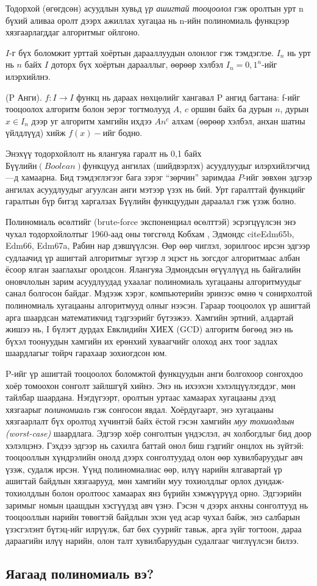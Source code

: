 Тодорхой (өгөгдсөн) асуудлын хувьд \textit{үр ашигтай тооцоолол} гэж оролтын урт n бүхий аливаа оролт дээрх ажиллах хугацаа нь n-ийн полиномиаль функцээр хязгаарлагддаг алгоритмыг ойлгоно.


$I$-г бүх боломжит урттай хоёртын дарааллуудын олонлог гэж тэмдэглэе. $I_n$ нь урт нь $n$ байх $I$ доторх бүх хоёртын дарааллыг, өөрөөр хэлбэл $I_n = {0,1}^n$-ийг илэрхийлнэ.


\begin{definition}
  (P Анги). $f : I \rightarrow I$ функц нь дараах нөхцөлийг хангавал P ангид багтана: f-ийг тооцоолох алгоритм болон эерэг тогтмолууд $A$, $c$ оршин байх ба дурын $n$, дурын $x \in I_n$ дээр уг алгоритм хамгийн ихдээ $An^c$ алхам (өөрөөр хэлбэл, анхан шатны үйлдлүүд) хийж $f(x)-ийг$ бодно.
\end{definition}


Энэхүү тодорхойлолт нь ялангуяа гаралт нь {0,1} байх $Бүүлийн (Boolean) функцууд$ ангилах (шийдвэрлэх) асуудлуудыг илэрхийлэгчид—д хамаарна. Бид тэмдэглэгээг бага зэрэг “зөрчин” заримдаа $P$-ийг зөвхөн эдгээр ангилах асуудлуудыг агуулсан анги мэтээр үзэх нь бий. Урт гаралттай функцийг гаралтын бүр битэд харгалзах Бүүлийн функцуудын дараалал гэж үзэж болно.


Полиномиаль өсөлтийг (brute-force экспоненциал өсөлттэй) эсрэгцүүлсэн энэ чухал тодорхойлолтыг 1960-аад оны төгсгөлд Кобхам \cite{Cob65}, Эдмондс cite{Edm65b, Edm66, Edm67a}, Рабин \cite{Rab67} нар дэвшүүлсэн. Өөр өөр чиглэл, зорилгоос ирсэн эдгээр судлаачид үр ашигтай алгоритмыг зүгээр л эцэст нь зогсдог алгоритмаас албан ёсоор ялган зааглахыг оролдсон. Ялангуяа Эдмондсын өгүүллүүд нь байгалийн оновчлолын зарим асуудлуудад ухаалаг полиномиаль хугацааны алгоритмуудыг санал болгосон байдаг. Мэдээж хэрэг, компьютерийн эринээс өмнө ч сонирхолтой полиномиаль хугацааны алгоритмууд олныг нээсэн. Гараар тооцоолох үр ашигтай арга шаардсан математикчид тэдгээрийг бүтээжээ. Хамгийн эртний, алдартай жишээ нь, I бүлэгт дурдах Евклидийн ХИЕХ (GCD) алгоритм бөгөөд энэ нь бүхэл тоонуудын хамгийн их ерөнхий хуваагчийг олоход анх тоог задлах шаардлагыг тойрч гарахаар зохиогдсон юм.


P-ийг үр ашигтай тооцоолох боломжтой функцуудын анги болгохоор сонгохдоо хоёр томоохон сонголт зайлшгүй хийнэ. Энэ нь ихээхэн хэлэлцүүлэгддэг, мөн тайлбар шаардана. Нэгдүгээрт, оролтын уртаас хамаарах хугацааны дээд хязгаарыг \textit{полиномиаль} гэж сонгосон явдал. Хоёрдугаарт, энэ хугацааны хязгаарлалт бүх оролтод хүчинтэй байх ёстой гэсэн хамгийн \textit{муу тохиолдлын (worst-case)} шаардлага. Эдгээр хоёр сонголтын үндэслэл, ач холбогдлыг бид доор хэлэлцэнэ. Гэхдээ эдгээр нь сахилга баттай онол биш гэдгийг онцлох нь зүйтэй: тооцооллын хүндрэлийн онолд дээрх сонголтуудад олон өөр хувилбаруудыг авч үзэж, судалж ирсэн. Үүнд полиномиалиас өөр, илүү нарийн ялгавартай үр ашигтай байдлын хязгаарууд, мөн хамгийн муу тохиолдлыг орлох дундаж-тохиолдлын болон оролтоос хамаарах янз бүрийн хэмжүүрүүд орно. Эдгээрийн заримыг номын цаашдын хэсгүүдэд авч үзнэ. Гэсэн ч дээрх анхны сонголтууд нь тооцооллын нарийн төвөгтэй байдлын эхэн үед асар чухал байж, энэ салбарын үзэсгэлэнт бүтэц-ийг илрүүлж, бат бөх суурийг тавьж, арга зүйг тогтоон, дараа дараагийн илүү нарийн, олон талт хувилбаруудын судалгааг чиглүүлсэн билээ.


\subsection{Яагаад полиномиаль вэ?}

